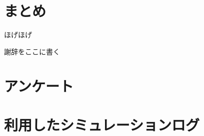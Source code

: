 \documentclass[uplatex,a4paper,12pt]{ujreport}
\begin{document}
\chapter{まとめ}
ほげほげ


\acknowledgment
謝辞をここに書く




\appendix
\chapter{アンケート}

\chapter{利用したシミュレーションログ}
\end{document}
